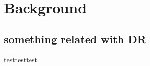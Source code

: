 \part{Background} \label{part:Background&related work}

\chapter{something related with DR}

testtesttest\\